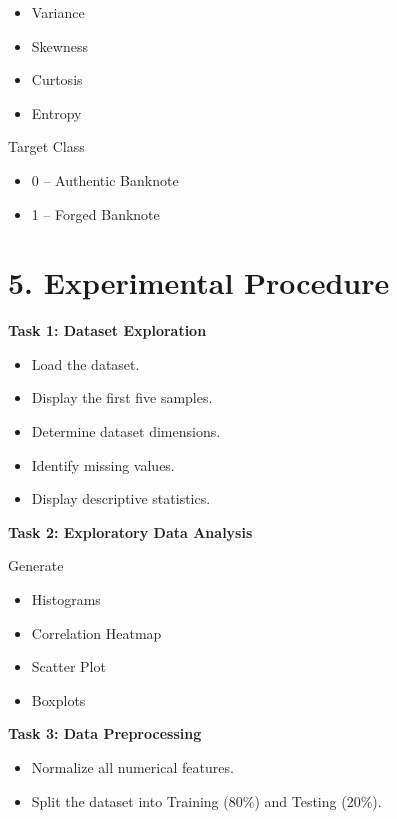 \documentclass[11pt]{article}
\begin{document}
\begin{itemize}
\item Variance
\item Skewness
\item Curtosis
\item Entropy
\end{itemize}

Target Class

\begin{itemize}
\item 0 -- Authentic Banknote
\item 1 -- Forged Banknote
\end{itemize}


\section*{5. Experimental Procedure}

\textbf{Task 1: Dataset Exploration}

\begin{itemize}
\item Load the dataset.
\item Display the first five samples.
\item Determine dataset dimensions.
\item Identify missing values.
\item Display descriptive statistics.
\end{itemize}

\vspace{2mm}

\textbf{Task 2: Exploratory Data Analysis}

Generate

\begin{itemize}
\item Histograms
\item Correlation Heatmap
\item Scatter Plot
\item Boxplots
\end{itemize}

\vspace{2mm}

\textbf{Task 3: Data Preprocessing}

\begin{itemize}
\item Normalize all numerical features.
\item Split the dataset into Training (80\%) and Testing (20\%).
\end{itemize}
\end{document}

